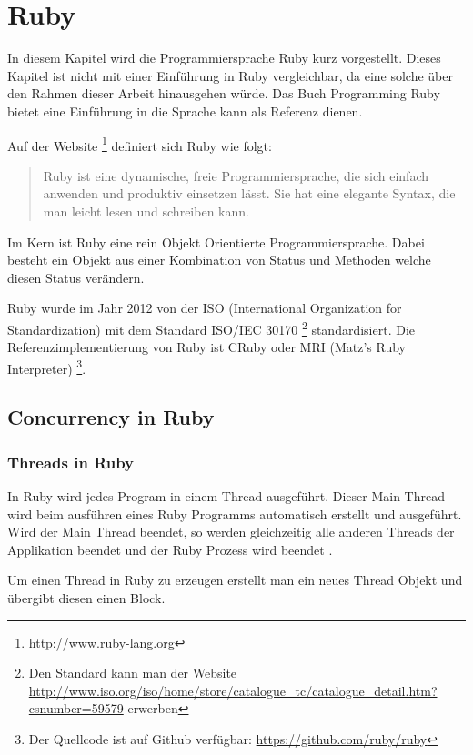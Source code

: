 \section{Ruby}
\label{section: Ruby}

In diesem Kapitel wird die Programmiersprache Ruby kurz vorgestellt. Dieses Kapitel ist nicht mit einer Einführung in Ruby vergleichbar, da eine solche über den Rahmen dieser Arbeit hinausgehen würde. Das Buch Programming Ruby \cite[]{Dav05} bietet eine Einführung in die Sprache kann als Referenz dienen. 

Auf der Website \footnote{\url{http://www.ruby-lang.org}} definiert sich Ruby wie folgt:

\begin{quote}
	Ruby ist eine dynamische, freie Programmiersprache, die sich einfach anwenden und produktiv einsetzen lässt. Sie hat eine elegante Syntax, die man leicht lesen und schreiben kann. \cite[]{Rub92}
\end{quote}

Im Kern ist Ruby eine rein Objekt Orientierte Programmiersprache. Dabei besteht ein Objekt aus einer Kombination von Status und Methoden welche diesen Status verändern. \cite[p. 1-2]{Dav05}

Ruby wurde im Jahr 2012 von der ISO (International Organization for Standardization) mit dem Standard ISO/IEC 30170 \footnote{Den Standard kann man der Website \url{http://www.iso.org/iso/home/store/catalogue_tc/catalogue_detail.htm?csnumber=59579} erwerben} standardisiert. Die Referenzimplementierung von Ruby ist CRuby oder MRI (Matz's Ruby Interpreter) \footnote{Der Quellcode ist auf Github verfügbar: \url{https://github.com/ruby/ruby}}.


\subsection{Concurrency in Ruby}

\subsubsection{Threads in Ruby}
In Ruby wird jedes Program in einem Thread ausgeführt. Dieser Main Thread wird beim ausführen eines Ruby Programms automatisch erstellt und ausgeführt. Wird der Main Thread beendet, so werden gleichzeitig alle anderen Threads der Applikation beendet und der Ruby Prozess wird beendet \cite[p. 15]{Sto2013}.

Um einen Thread in Ruby zu erzeugen erstellt man ein neues Thread Objekt und übergibt diesen einen Block. 

